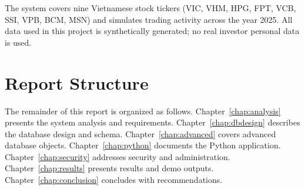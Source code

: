 The system covers nine Vietnamese stock tickers (VIC, VHM, HPG, FPT, VCB, SSI, VPB, BCM, MSN) and simulates trading activity across the year 2025. All data used in this project is synthetically generated; no real investor personal data is used.

\section{Report Structure}

The remainder of this report is organized as follows. Chapter~\ref{chap:analysis} presents the system analysis and requirements. Chapter~\ref{chap:dbdesign} describes the database design and schema. Chapter~\ref{chap:advanced} covers advanced database objects. Chapter~\ref{chap:python} documents the Python application. Chapter~\ref{chap:security} addresses security and administration. Chapter~\ref{chap:results} presents results and demo outputs. Chapter~\ref{chap:conclusion} concludes with recommendations.
